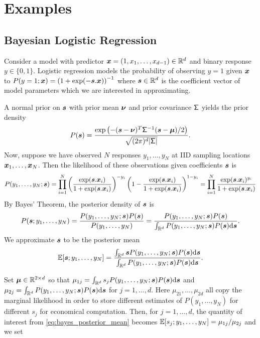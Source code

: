 \documentclass{article}[12pt]
\begin{document}
\section{Examples}



\subsection{Bayesian Logistic Regression}

Consider a model with predictor $\boldsymbol{x} = (1,x_1, \dots, x_{d-1}) \in \mathbb{R}^d$ and binary response $y \in \{0,1\}$. Logistic regression models the probability of observing $y = 1$ given $\boldsymbol{x}$ to $P(y=1;\boldsymbol{x}) = \left(1+\exp(-\boldsymbol{s}.\boldsymbol{x})\right)^{-1}$ where $\boldsymbol{s} \in \mathbb{R}^d$ is the coefficient vector of model parameters which we are interested in approximating.

A normal prior on $\boldsymbol{s}$ with prior mean $\boldsymbol{\nu}$ and prior covariance $\mathsf{\Sigma}$ yields the prior density
$$P(\boldsymbol{s}) = \frac{\exp\left(-(\boldsymbol{s}-\boldsymbol{\nu})^T\mathsf{\Sigma}^{-1}(\boldsymbol{s}-\boldsymbol{\mu})/2\right)}{\sqrt{(2\pi)^d\lvert \mathsf{\Sigma}\rvert}}.$$ Now, suppose we have observed $N$ responses $y_1,\dots,y_N$ at IID sampling locations $\boldsymbol{x}_1,\dots,\boldsymbol{x}_N$. Then the likelihood of these observations given coefficients $\boldsymbol{s}$ is
\begin{equation*}
    P(y_1,\dots,y_N ; \boldsymbol{s}) = \prod_{i=1}^N \left(\frac{\exp(\boldsymbol{s}.\boldsymbol{x}_i)}{1+\exp(\boldsymbol{s}.\boldsymbol{x}_i)}\right)^{-y_i} \left(1-\frac{\exp(\boldsymbol{s}.\boldsymbol{x}_i)}{1+\exp(\boldsymbol{s}.\boldsymbol{x}_i)}\right)^{1-y_i} = \prod_{i=1}^N \frac{\exp(\boldsymbol{s}.\boldsymbol{x}_i)^{y_i}}{1+\exp(\boldsymbol{s}.\boldsymbol{x}_i)}
\end{equation*}
By Bayes' Theorem, the posterior density of $\boldsymbol{s}$ is 
$$P(\boldsymbol{s};y_1,\dots,y_N) = \frac{P(y_1,\dots,y_N;\boldsymbol{s})P(\boldsymbol{s})}{P(y_1,\dots,y_N)} = \frac{P(y_1,\dots,y_N;\boldsymbol{s})P(\boldsymbol{s})}{\int_{\mathbb{R}^d} P(y_1,\dots,y_N;\boldsymbol{s})P(\boldsymbol{s})\mathrm{d}\boldsymbol{s}}.$$
We approximate $\boldsymbol{s}$ to be the posterior mean
\begin{equation}
    \mathbb{E}[\boldsymbol{s};y_1,\dots,y_N] = \frac{\int_{\mathbb{R}^d}\boldsymbol{s} P(y_1,\dots,y_N;\boldsymbol{s})P(\boldsymbol{s})\mathrm{d}\boldsymbol{s}}{\int_{\mathbb{R}^d}P(y_1,\dots,y_N;\boldsymbol{s})P(\boldsymbol{s})\mathrm{d}\boldsymbol{s}}. \label{eq:bayes_posterior_mean}
\end{equation}

Set $\boldsymbol{\mu} \in \mathbb{R}^{2 \times d}$ so that $\mu_{1j} = \int_{\mathbb{R}^d}s_j P(y_1,\dots,y_N;\boldsymbol{s})P(\boldsymbol{s})\mathrm{d}\boldsymbol{s}$ and $\mu_{2j} = \int_{\mathbb{R}^d}P(y_1,\dots,y_N;\boldsymbol{s})P(\boldsymbol{s})\mathrm{d}\boldsymbol{s}$ for $j=1,\dots,d$. Here $\mu_{21},\dots,\mu_{2d}$ all copy the marginal likelihood in order to store different estimates of $P(y_1,\dots,y_N)$ for different $s_j$ for economical computation.  Then, for $j=1,\dots,d$,  the quantity of interest from \eqref{eq:bayes_posterior_mean} becomes $\mathbb{E}[s_j;y_1,\dots,y_N] = \mu_{1j}/\mu_{2j}$ and we set
\end{document}

